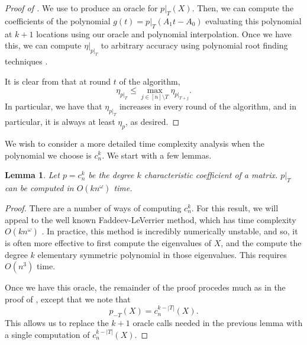 \documentclass{amsart}
\newtheorem{lemma}[theorem]{Lemma}
\theoremstyle{definition}
\begin{document}
\begin{proof}[Proof of ]
    We use  to produce an oracle for $p|_T(X)$.
    Then, we can compute the coefficients of the polynomial $g(t) = p|_T(A_1 t - A_0)$ evaluating this polynomial at $k+1$ locations using our oracle and polynomial interpolation.
    Once we have this, we can compute $\eta|_{p|_T}$ to arbitrary accuracy using polynomial root finding techniques \cite{pinkert1976exact,ben1988fast}.

    It is clear from  that at round $t$ of the algorithm,
    \[
        \eta_{p|_T} \le \max_{j \in [n] \setminus T} \eta_{p|_{T+j}}.
    \]
    In particular, we have that $\eta_{p|_T}$ increases in every round of the algorithm, and in particular, it is always at least $\eta_p$, as desired.
\end{proof}

We wish to consider a more detailed time complexity analysis when the polynomial we choose is $c_n^k$. We start with a few lemmas.
\begin{lemma}
    \label{lem:char_comp}
    Let $p = c_n^k$ be the degree $k$ characteristic coefficient of a matrix. $p|_T$ can be computed in $O(kn^{\omega})$ time.
\end{lemma}
\begin{proof}
    There are a number of ways of computing $c_n^k$. For this result, we will appeal to the well known Faddeev-LeVerrier method, which has time complexity $O(kn^{\omega})$ \cite{baer2021faddeev}. In practice, this method is incredibly numerically unstable, and so, it is often more effective to first compute the eigenvalues of $X$, and the compute the degree $k$ elementary symmetric polynomial in those eigenvalues. This requires $O(n^3)$ time.

    Once we have this oracle, the remainder of the proof procedes much as in the proof of , except that we note that
    \[
        p_{-T}(X) = c_n^{k-|T|}(X).
    \]
    This allows us to replace the $k+1$ oracle calls needed in the previous lemma with a single computation of $c_n^{k-|T|}(X)$.
\end{proof}
\end{document}
